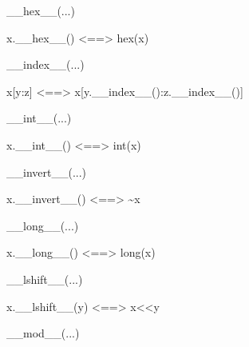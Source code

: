 \documentclass[letterpaper,10pt,english]{sphinxmanual}
\begin{document}
\begin{description}
\begin{description}
\begin{DUlineblock}{0em}
\begin{DUlineblock}{\DUlineblockindent}
\item[] 
\end{DUlineblock}
\item[] \_\_hex\_\_(...)
\item[]
\begin{DUlineblock}{\DUlineblockindent}
\item[] x.\_\_hex\_\_() \textless{}==\textgreater{} hex(x)
\item[] 
\end{DUlineblock}
\item[] \_\_index\_\_(...)
\item[]
\begin{DUlineblock}{\DUlineblockindent}
\item[] x{[}y:z{]} \textless{}==\textgreater{} x{[}y.\_\_index\_\_():z.\_\_index\_\_(){]}
\item[] 
\end{DUlineblock}
\item[] \_\_int\_\_(...)
\item[]
\begin{DUlineblock}{\DUlineblockindent}
\item[] x.\_\_int\_\_() \textless{}==\textgreater{} int(x)
\item[] 
\end{DUlineblock}
\item[] \_\_invert\_\_(...)
\item[]
\begin{DUlineblock}{\DUlineblockindent}
\item[] x.\_\_invert\_\_() \textless{}==\textgreater{} \textasciitilde{}x
\item[] 
\end{DUlineblock}
\item[] \_\_long\_\_(...)
\item[]
\begin{DUlineblock}{\DUlineblockindent}
\item[] x.\_\_long\_\_() \textless{}==\textgreater{} long(x)
\item[] 
\end{DUlineblock}
\item[] \_\_lshift\_\_(...)
\item[]
\begin{DUlineblock}{\DUlineblockindent}
\item[] x.\_\_lshift\_\_(y) \textless{}==\textgreater{} x\textless{}\textless{}y
\item[] 
\end{DUlineblock}
\item[] \_\_mod\_\_(...)

\end{DUlineblock}
\end{description}
\end{description}
\end{document}
